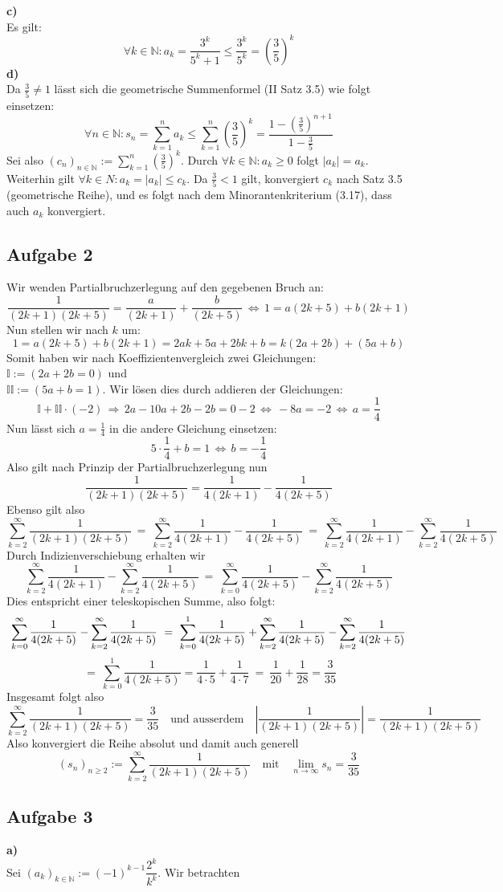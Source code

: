 \documentclass[a4paper,graphics,11pt]{article}
\newcommand{\aufgabe}[1]{\subsection*{Aufgabe #1}}
\begin{document}
\textbf{c)}\\[5pt]
Es gilt:
$$
    \forall k \in \mathbb{N} \colon a_k
    = \frac{3^k}{5^k+1}
    \leq \frac{3^k}{5^k}
    = \left(\frac{3}{5}\right)^k
$$
\textbf{d)}\\[5pt]
Da $\frac{3}{5}\neq1$ lässt sich die geometrische Summenformel (II Satz 3.5)
wie folgt einsetzen:
$$
    \forall n \in \mathbb{N} \colon s_n
    = \sum_{k=1}^{n} a_k
    \leq \sum_{k=1}^{n} \left(\frac{3}{5}\right)^k
    = \frac{1-\left(\frac{3}{5}\right)^{n+1}}{1-\frac{3}{5}}
$$
Sei also $(c_n)_{n \in \mathbb{N}} := \sum_{k=1}^{n} \left(\frac{3}{5}\right)^k$.
Durch $\forall k \in \mathbb{N} \colon a_k \geq 0$ folgt $|a_k| = a_k$.\\
Weiterhin gilt $\forall k \in N\colon a_k = |a_k| \leq c_k$. Da $\frac{3}{5}< 1$ gilt, konvergiert
$c_k$ nach Satz 3.5 (geometrische Reihe), und es folgt nach dem Minorantenkriterium (3.17), dass auch $a_k$ konvergiert.
\aufgabe{2}
Wir wenden Partialbruchzerlegung auf den gegebenen Bruch an:
$$
    \frac{1}{(2k+1)(2k+5)} = \frac{a}{(2k+1)} + \frac{b}{(2k+5)} \,\Longleftrightarrow\,
    1 = a(2k+5) + b(2k+1)
$$
Nun stellen wir nach $k$ um:
$$
    1 = a(2k+5) + b(2k+1) = 2ak+5a+2bk+b = k(2a+2b) + (5a+b)
$$
Somit haben wir nach Koeffizientenvergleich zwei Gleichungen: $ \mathbb{I}:=(2a+2b = 0)$
und \\$\mathbb{II}:=(5a+b = 1)$. Wir lösen dies durch addieren der Gleichungen:
$$
    \mathbb{I} + \mathbb{II}\cdot(-2) \,\Longrightarrow\, 2a-10a+2b-2b=0-2
    \,\Longleftrightarrow\, -8a = -2
    \,\Longleftrightarrow\, a = \frac{1}{4}
$$
Nun lässt sich $a = \frac{1}{4}$ in die andere Gleichung einsetzen:
$$
    5\cdot \frac{1}{4}+b = 1 \,\Longleftrightarrow\, b = -\frac{1}{4}
$$
Also gilt nach Prinzip der Partialbruchzerlegung nun
$$
    \frac{1}{(2k+1)(2k+5)} = \frac{1}{4(2k+1)} - \frac{1}{4(2k+5)}
$$
Ebenso gilt also
$$
    \sum_{k=2}^{\infty} \frac{1}{(2k+1)(2k+5)}
    \ =\ \sum_{k=2}^{\infty} \frac{1}{4(2k+1)} - \frac{1}{4(2k+5)}
    \ =\ \sum_{k=2}^{\infty} \frac{1}{4(2k+1)} - \sum_{k=2}^{\infty} \frac{1}{4(2k+5)}
$$
Durch Indizienverschiebung erhalten wir
$$
    \sum_{k=2}^{\infty} \frac{1}{4(2k+1)} - \sum_{k=2}^{\infty} \frac{1}{4(2k+5)}
    \ =\ \sum_{k=0}^{\infty} \frac{1}{4(2k+5)} - \sum_{k=2}^{\infty} \frac{1}{4(2k+5)}
$$
Dies entspricht einer teleskopischen Summe, also folgt:
$$
    \sum_{k=0}^{\infty} \frac{1}{4(2k+5)} - \sum_{k=2}^{\infty} \frac{1}{4(2k+5)}
    \ =\ \sum_{k=0}^{1} \frac{1}{4(2k+5)} +
    \sum_{k=2}^{\infty} \frac{1}{4(2k+5)} - \sum_{k=2}^{\infty} \frac{1}{4(2k+5)}\\
$$$$
    \ =\ \sum_{k=0}^{1} \frac{1}{4(2k+5)} = \frac{1}{4\cdot 5} + \frac{1}{4\cdot 7} 
    \ =\ \frac{1}{20} + \frac{1}{28} = \frac{3}{35}
$$
Insgesamt folgt also
$$
    \sum_{k=2}^{\infty} \frac{1}{(2k+1)(2k+5)} = \frac{3}{35}
    \quad\text{und ausserdem}\quad
    \left|\frac{1}{(2k+1)(2k+5)} \right| = \frac{1}{(2k+1)(2k+5)}
$$
Also konvergiert die Reihe absolut und damit auch generell
$$
    (s_n)_{n\geq 2} := \sum_{k=2}^{\infty} \frac{1}{(2k+1)(2k+5)}\quad\text{mit}\quad
    \lim_{n \to \infty} s_n = \frac{3}{35}
$$
\aufgabe{3}
\textbf{a)}\\[5pt]
Sei $(a_k)_{k \in \mathbb{N}} := (-1)^{k-1}\dfrac{2^k}{k^k}$. Wir betrachten
\end{document}
